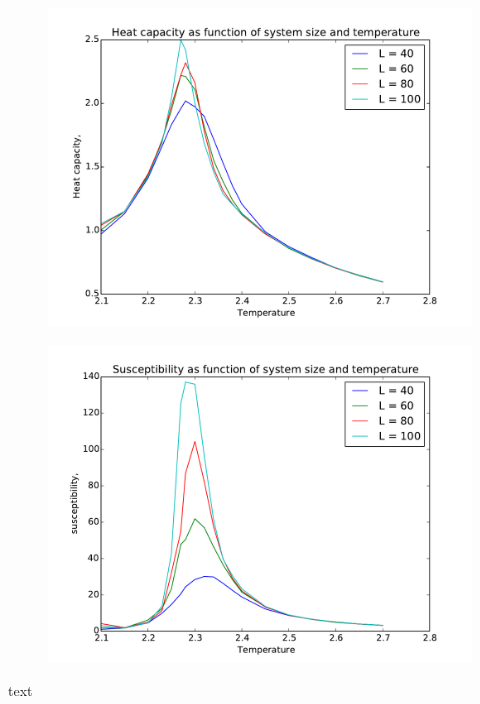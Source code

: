\begin{figure}[H]
	\centering
	\includegraphics[width=0.7\linewidth]{../results/4e/4e_Cv}
	\caption{}
	\label{fig:4ecv}
\end{figure}

\begin{figure}[H]
	\centering
	\includegraphics[width=0.7\linewidth]{../results/4e/4e_x}
	\caption{}
	\label{fig:4ex}
\end{figure}


\begin{table}[H]
	\caption{text}
	\label{tab: T_C}
	\begin{tabular}{cccccc}
		
	\end{tabular}
\end{table}

